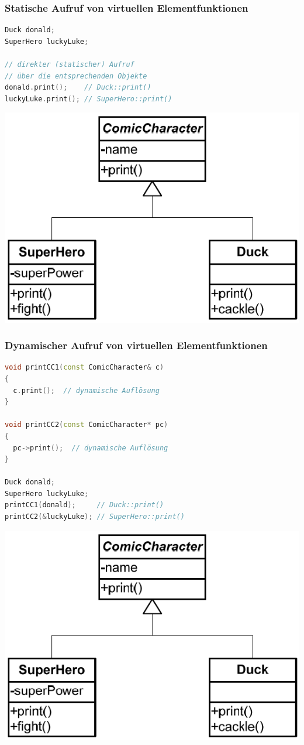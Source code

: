 \subsubsection{Statische Aufruf von virtuellen Elementfunktionen}
\begin{multicols}{2}
\begin{lstlisting}[language=C++]
Duck donald;
SuperHero luckyLuke;

// direkter (statischer) Aufruf
// über die entsprechenden Objekte
donald.print();    // Duck::print()
luckyLuke.print(); // SuperHero::print()
\end{lstlisting}
\vfill\null
\columnbreak
\includegraphics[width=0.5\linewidth]{images/AdvancedCPP/classDiagram}
\end{multicols}

\subsubsection{Dynamischer Aufruf von virtuellen Elementfunktionen}
\begin{multicols}{2}
\begin{lstlisting}[language=C++]
void printCC1(const ComicCharacter& c)
{
  c.print();  // dynamische Auflösung
}

void printCC2(const ComicCharacter* pc)
{
  pc->print();  // dynamische Auflösung
}

Duck donald;
SuperHero luckyLuke;
printCC1(donald);     // Duck::print()
printCC2(&luckyLuke); // SuperHero::print()
\end{lstlisting}
\vfill\null
\columnbreak
\includegraphics[width=0.5\linewidth]{images/AdvancedCPP/classDiagram}
\end{multicols}

